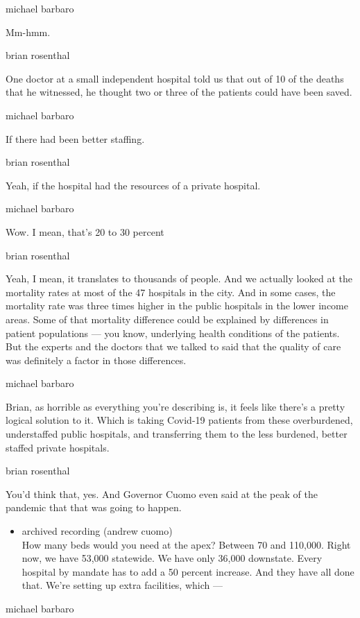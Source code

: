 michael barbaro

Mm-hmm.

brian rosenthal

One doctor at a small independent hospital told us that out of 10 of the
deaths that he witnessed, he thought two or three of the patients could
have been saved.

michael barbaro

If there had been better staffing.

brian rosenthal

Yeah, if the hospital had the resources of a private hospital.

michael barbaro

Wow. I mean, that's 20 to 30 percent

brian rosenthal

Yeah, I mean, it translates to thousands of people. And we actually
looked at the mortality rates at most of the 47 hospitals in the city.
And in some cases, the mortality rate was three times higher in the
public hospitals in the lower income areas. Some of that mortality
difference could be explained by differences in patient populations ---
you know, underlying health conditions of the patients. But the experts
and the doctors that we talked to said that the quality of care was
definitely a factor in those differences.

michael barbaro

Brian, as horrible as everything you're describing is, it feels like
there's a pretty logical solution to it. Which is taking Covid-19
patients from these overburdened, understaffed public hospitals, and
transferring them to the less burdened, better staffed private
hospitals.

brian rosenthal

You'd think that, yes. And Governor Cuomo even said at the peak of the
pandemic that that was going to happen.

\begin{itemize}
\tightlist
\item
  archived recording (andrew cuomo)\\
  How many beds would you need at the apex? Between 70 and 110,000.
  Right now, we have 53,000 statewide. We have only 36,000 downstate.
  Every hospital by mandate has to add a 50 percent increase. And they
  have all done that. We're setting up extra facilities, which ---
\end{itemize}

michael barbaro

